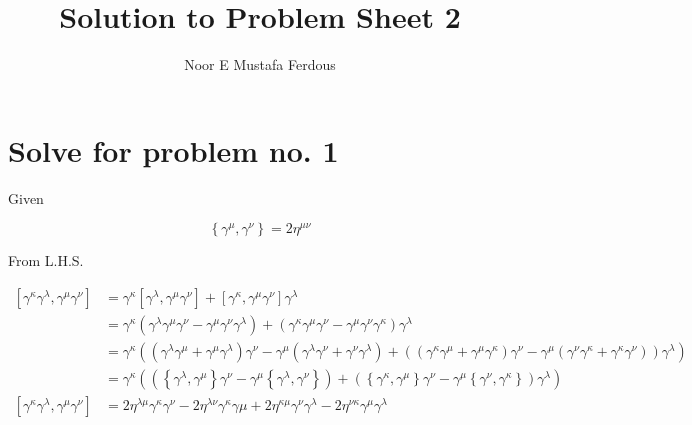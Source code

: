 \documentclass[12pt, letterpaper]{article}
\title{Solution to Problem Sheet 2}
\author{Noor E Mustafa Ferdous}
\date{}
\newcommand*{\1}{\hspace{1pt}}
\begin{document}
\maketitle

\section*{Solve for problem no. 1}
Given

\begin{equation}
    \left\{ \gamma ^{\mu}, \gamma ^{\nu} \right\} = 2 \eta ^{\mu \nu}    
\end{equation}

From L.H.S. 

\begin{align*}
    \left[ \gamma ^{\kappa} \gamma ^{\lambda}, \gamma ^{\mu} \gamma ^{\nu} \right] &= \gamma ^{\kappa} \left[ \gamma ^{\lambda}, \gamma ^{\mu} \gamma ^{\nu}\right] + \left[\gamma ^{\kappa}, \gamma ^{\mu} \gamma ^{\nu}\right] \gamma ^{\lambda} \\ 
    &= \gamma ^{\kappa} \left( \gamma ^{\lambda}\gamma ^{\mu} \gamma ^{\nu} - \gamma ^{\mu} \gamma ^{\nu}\gamma ^{\lambda}\right) + \left(\gamma ^{\kappa}\gamma ^{\mu} \gamma ^{\nu} - \gamma ^{\mu} \gamma ^{\nu} \gamma ^{\kappa}\right)\gamma ^{\lambda} \\ 
    &= \gamma ^{\kappa} \left( \left(\gamma ^{\lambda}\gamma ^{\mu} + \gamma ^{\mu}\gamma ^{\lambda}\right) \gamma ^{\nu} - \gamma ^{\mu} \left( \gamma ^{\lambda} \gamma ^{\nu} + \gamma ^{\nu} \gamma ^{\lambda} \right) + \left( \left(\gamma ^{\kappa}\gamma ^{\mu} +\gamma ^{\mu}\gamma ^{\kappa}\right) \gamma ^{\nu} - \gamma ^{\mu} \left(\gamma ^{\nu} \gamma ^{\kappa} + \gamma ^{\kappa} \gamma ^{\nu} \right) \right)\gamma ^{\lambda}\right) \\
    &= \gamma ^{\kappa} \left(\left( \left\{ \gamma ^{\lambda}, \gamma ^{\mu} \right\} \gamma ^{\nu} - \gamma ^{\mu} \left\{ \gamma ^{\lambda}, \gamma ^{\nu} \right\} \right) + \left( \left\{ \gamma ^{\kappa}, \gamma ^{\mu} \right\} \gamma ^{\nu} - \gamma ^{\mu} \left\{\gamma ^{\nu}, \gamma ^{\kappa} \right\} \right)\gamma ^{\lambda}\right) \\
   \left[ \gamma ^{\kappa} \gamma ^{\lambda}, \gamma ^{\mu} \gamma ^{\nu} \right] &= 2\eta ^{\lambda \mu} \gamma ^{\kappa} \gamma ^{\nu} - 2\eta ^{\lambda \nu} \gamma ^{\kappa} \gamma \mu + 2\eta ^{\kappa \mu} \gamma ^{\nu} \gamma ^{\lambda} - 2\eta ^{\nu \kappa} \gamma ^{\mu} \gamma ^{\lambda} \tag{Showed}
\end{align*}
\end{document}
